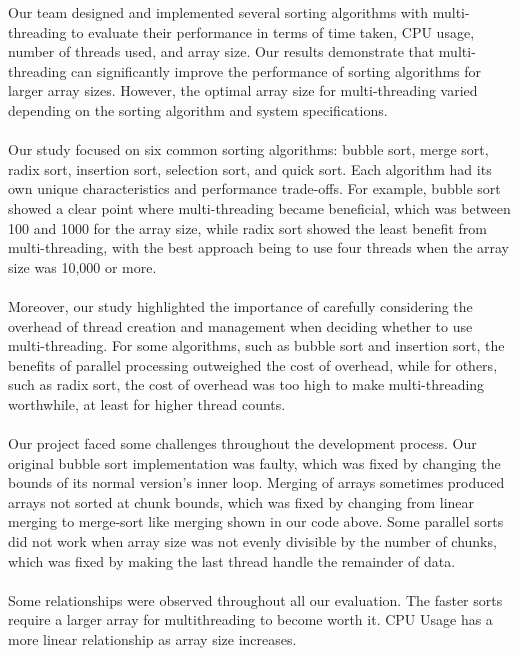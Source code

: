 \documentclass[conference]{IEEEtran}
\begin{document}
Our team designed and implemented several sorting algorithms with multi-threading to evaluate their performance in terms of time taken, CPU usage, number of threads used, and array size. Our results demonstrate that multi-threading can significantly improve the performance of sorting algorithms for larger array sizes. However, the optimal array size for multi-threading varied depending on the sorting algorithm and system specifications.
\\\\
Our study focused on six common sorting algorithms: bubble sort, merge sort, radix sort, insertion sort, selection sort, and quick sort. Each algorithm had its own unique characteristics and performance trade-offs. For example, bubble sort showed a clear point where multi-threading became beneficial, which was between 100 and 1000 for the array size, while radix sort showed the least benefit from multi-threading, with the best approach being to use four threads when the array size was 10,000 or more.
\\\\
Moreover, our study highlighted the importance of carefully considering the overhead of thread creation and management when deciding whether to use multi-threading. For some algorithms, such as bubble sort and insertion sort, the benefits of parallel processing outweighed the cost of overhead, while for others, such as radix sort, the cost of overhead was too high to make multi-threading worthwhile, at least for higher thread counts.
\\\\
Our project faced some challenges throughout the development process. Our original bubble sort implementation was faulty, which was fixed by changing the bounds of its normal version's inner loop. Merging of arrays sometimes produced arrays not sorted at chunk bounds, which was fixed by changing from linear merging to merge-sort like merging shown in our code above. Some parallel sorts did not work when array size was not evenly divisible by the number of chunks, which was fixed by making the last thread handle the remainder of data.
\\\\
Some relationships were observed throughout all our evaluation. The faster sorts require a larger array for multithreading to become worth it. CPU Usage has a more linear relationship as array size increases.
\\\\
\end{document}
